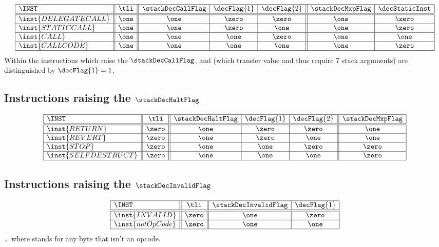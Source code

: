 \[
\begin{array}{|l||c||c|c|c||c|c|}
	\hline
	\INST				& \tli	& \stackDecCallFlag 	& \decFlag{1}	& \decFlag{2}	& \stackDecMxpFlag	& \decStaticInst	\\ \hline\hline
	\inst{DELEGATECALL} & \one	& \one			& \zero			& \zero			& \one			& \zero				\\ \hline
	\inst{STATICCALL} 	& \one	& \one			& \zero			& \one			& \one			& \zero				\\ \hline
	\inst{CALL} 		& \one	& \one			& \one			& \zero			& \one			& \one				\\ \hline
	\inst{CALLCODE} 	& \one	& \one			& \one			& \one			& \one			& \zero				\\ \hline
\end{array}
\]
\saNote{} Within the instructions which raise the $\stackDecCallFlag$,  and  (which transfer value and thus require 7 stack arguments) are distinguished by  $\decFlag{1} = 1$.

\subsection{Instructions raising the $\stackDecHaltFlag$}
\label{hub: instruction handling: Halt}

\[
\begin{array}{|l||c||c|c|c||c|}
	\hline
	\INST 				& \tli	& \stackDecHaltFlag 	& \decFlag{1}	& \decFlag{2}	& \stackDecMxpFlag	\\ \hline\hline
	\inst{RETURN}		& \zero	& \one			& \zero			& \zero			& \one			\\ \hline
	\inst{REVERT}		& \zero	& \one			& \zero			& \one			& \one			\\ \hline
	\inst{STOP}			& \zero	& \one			& \one			& \zero			& \zero			\\ \hline
	\inst{SELFDESTRUCT}	& \zero	& \one			& \one			& \one			& \zero			\\ \hline
\end{array}
\]

\subsection{Instructions raising the $\stackDecInvalidFlag$}
\label{hub: instruction handling: Invalid}

\[
\begin{array}{|l||c||c|c|}
	\hline
	\INST 				& \tli	& \stackDecInvalidFlag	& \decFlag{1}	\\ \hline\hline
	\inst{INVALID}		& \zero	& \one				& \zero			\\ \hline
	\inst{notOpCode}	& \zero	& \one				& \one			\\ \hline
\end{array}
\]
\dots{} where  stands for any byte that isn't an opcode.

\fi
